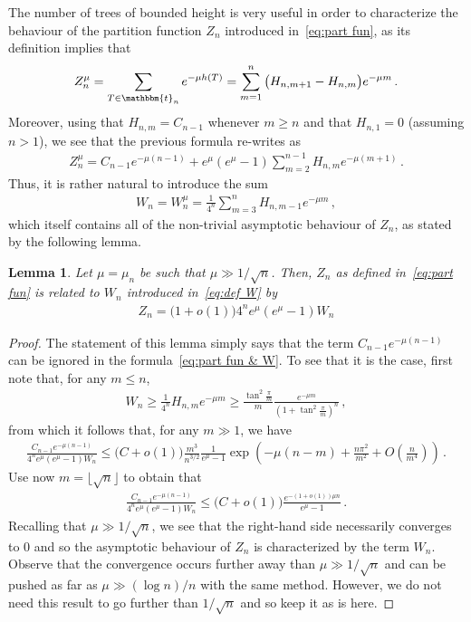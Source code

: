 \documentclass{article}
\newcommand{\bbt}{\mathbbm{t}}
\newcommand{\1}{\mathbbm{1}}								%
\newtheorem{lemma}[theorem]{Lemma}
\theoremstyle{definition}
\numberwithin{equation}{section}
\begin{document}
The number of trees of bounded height is very useful in order to characterize the behaviour of the partition function $Z_n$ introduced in~\eqref{eq:part fun}, as its definition implies that
\begin{align*}
    Z_n^\mu=\sum_{T\in\bbt_n}e^{-\mu h(T)}=\sum_{m=1}^n\big(H_{n,m+1}-H_{n,m}\big)e^{-\mu m}\,.
\end{align*}
Moreover, using that $H_{n,m}=C_{n-1}$ whenever $m\geq n$ and that $H_{n,1}=0$ (assuming $n>1$), we see that the previous formula re-writes as
\begin{align}\label{eq:part fun & W}
    Z_n^\mu=C_{n-1}e^{-\mu(n-1)}+e^\mu(e^\mu-1)\sum_{m=2}^{n-1}H_{n,m}e^{-\mu(m+1)}\,.
\end{align}
Thus, it is rather natural to introduce the sum
\begin{align}\label{eq:def W}
    W_n=W_n^\mu=\frac{1}{4^n}\sum_{m=3}^{n}H_{n,m-1}e^{-\mu m}\,,
\end{align}
which itself contains all of the non-trivial asymptotic behaviour of $Z_n$, as stated by the following lemma.

\begin{lemma}\label{lem:z and w}
    Let $\mu=\mu_n$ be such that $\mu\gg1/\sqrt{n}$.
    Then, $Z_n$ as defined in~\eqref{eq:part fun} is related to $W_n$ introduced in~\eqref{eq:def W} by
    \begin{align*}
        Z_n=\big(1+o(1)\big)4^ne^\mu(e^\mu-1)W_n
    \end{align*}
\end{lemma}

\begin{proof}
    The statement of this lemma simply says that the term $C_{n-1}e^{-\mu(n-1)}$ can be ignored in the formula~\eqref{eq:part fun & W}.
    To see that it is the case, first note that, for any $m \leq n$,
    \begin{align*}
        W_n\geq\frac{1}{4^n}H_{n,m}e^{-\mu m}\geq\frac{\tan^2\frac{\pi}{m}}{m}\frac{e^{-\mu m}}{\left(1+\tan^2\frac{\pi}{m}\right)^n}\,,
    \end{align*}
    from which it follows that, for any $m\gg1$, we have
    \begin{align*}
        \frac{C_{n-1}e^{-\mu(n-1)}}{4^ne^\mu(e^\mu-1)W_n}\leq\big(C+o(1)\big)\frac{m^3}{n^{3/2}}\frac{1}{e^\mu-1}\exp\left(-\mu(n-m)+\frac{n\pi^2}{m^2}+O\left(\frac{n}{m^4}\right)\right)\,.
    \end{align*}
    Use now $m=\lfloor\sqrt{n}\rfloor$ to obtain that
    \begin{align*}
        \frac{C_{n-1}e^{-\mu(n-1)}}{4^ne^\mu(e^\mu-1)W_n}\leq\big(C+o(1)\big)\frac{e^{-(1+o(1))\mu n}}{e^\mu-1}\,.
    \end{align*}
    Recalling that $\mu\gg1/\sqrt{n}$, we see that the right-hand side necessarily converges to $0$ and so the asymptotic behaviour of $Z_n$ is characterized by the term $W_n$.
    Observe that the convergence occurs further away than $\mu\gg1/\sqrt{n}$ and can be pushed as far as $\mu\gg(\log n)/n$ with the same method.
    However, we do not need this result to go further than $1/\sqrt{n}$ and so keep it as is here.
\end{proof}
\end{document}
